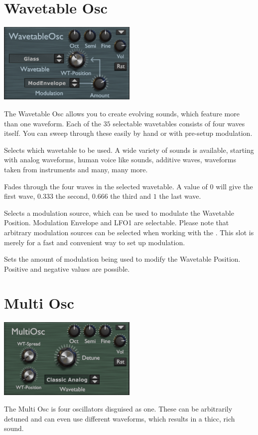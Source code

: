 \section{Wavetable Osc}
\begin{center}
    \includegraphics[width=0.5\textwidth]{graphics/wavetable_osc.png}
\end{center}
The Wavetable Osc allows you to create evolving sounds, which feature more than one waveform. Each of the $35$ selectable wavetables consists of four waves itself. You can sweep through these easily by hand or with pre-setup modulation.

{Selects which wavetable to be used. A wide variety of sounds is available, starting with analog waveforms, human voice like sounds, additive waves, waveforms taken from instruments and many, many more.}

{Fades through the four waves in the selected wavetable. A value of $0$ will give the first wave, $0.333$ the second, $0.666$ the third and $1$ the last wave.}

{Selects a modulation source, which can be used to modulate the Wavetable Position. Modulation Envelope and LFO1 are selectable. Please note that arbitrary modulation sources can be selected when working with the \modmatrix. This slot is merely for a fast and convenient way to set up modulation.}

{Sets the amount of modulation being used to modify the Wavetable Position. Positive and negative values are possible.}

\section{Multi Osc}
\begin{center}
    \includegraphics[width=0.5\textwidth]{graphics/multi_osc.png}
\end{center}
The Multi Osc is four oscillators disguised as one. These can be arbitrarily detuned and can even use different waveforms, which results in a thicc, rich sound.

